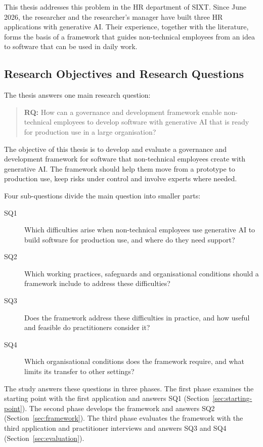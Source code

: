 \documentclass[10pt,a4paper]{article}
\begin{document}
This thesis addresses this problem in the HR department of SIXT. Since
June 2026, the researcher and the researcher's manager have built three
HR applications with generative AI. Their experience, together with the
literature, forms the basis of a framework that guides non-technical
employees from an idea to software that can be used in daily work.
 
 
\subsection{Research Objectives and Research Questions}
\label{sec:research-questions}
 
The thesis answers one main research question:
 
\begin{quote}
\textbf{RQ:} How can a governance and development framework enable
non-technical employees to develop software with generative AI that is
ready for production use in a large organisation?
\end{quote}
 
The objective of this thesis is to develop and evaluate a governance and
development framework for software that non-technical employees create
with generative AI. The framework should help them move from a prototype
to production use, keep risks under control and involve experts where
needed.

Four sub-questions divide the main question into smaller parts:
 
\begin{description}
    \item[SQ1] Which difficulties arise when non-technical employees use
    generative AI to build software for production use, and where do
    they need support?
    \item[SQ2] Which working practices, safeguards and organisational
    conditions should a framework include to address these difficulties?
    \item[SQ3] Does the framework address these difficulties in
    practice, and how useful and feasible do practitioners consider it?
    \item[SQ4] Which organisational conditions does the framework
    require, and what limits its transfer to other settings?
\end{description}
 
The study answers these questions in three phases. The first phase
examines the starting point with the first application and answers
SQ1 (Section~\ref{sec:starting-point}). The second phase develops the
framework and answers SQ2 (Section~\ref{sec:framework}). The third phase
evaluates the framework with the third application and practitioner
interviews and answers SQ3 and SQ4 (Section~\ref{sec:evaluation}).
 
\end{document}
